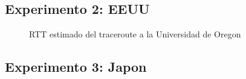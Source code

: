 \newpage
\subsection{Experimento 2: EEUU}

\begin{landscape}

\end{landscape}

\begin{figure}[H]
  \centering
  \caption{RTT estimado del traceroute a la Universidad de Oregon }
  \label{eeuuTTL}
\end{figure}


\newpage
\subsection{Experimento 3: Japon}

\begin{landscape}
  
\end{landscape}


